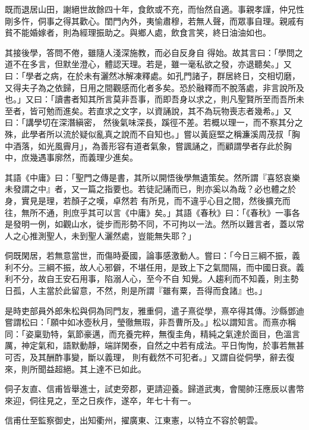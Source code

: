 \begin{pinyinscope}
 既而退居山田，謝絕世故餘四十年，食飲或不充，而怡然自適。事親孝謹，仲兄性剛多忤，侗事之得其歡心。閨門內外，夷愉肅穆，若無人聲，而眾事自理。親戚有貧不能婚嫁者，則為經理振助之。與鄉人處，飲食言笑，終日油油如也。



 其接後學，答問不倦，雖隨人淺深施教，而必自反身自
 得始。故其言曰：「學問之道不在多言，但默坐澄心，體認天理。若是，雖一毫私欲之發，亦退聽矣。」又曰：「學者之病，在於未有灑然冰解凍釋處。如孔門諸子，群居終日，交相切磨，又得夫子為之依歸，日用之間觀感而化者多矣。恐於融釋而不脫落處，非言說所及也。」又曰：「讀書者知其所言莫非吾事，而即吾身以求之，則凡聖賢所至而吾所未至者，皆可勉而進矣。若直求之文字，以資誦說，其不為玩物喪志者幾希。」又曰：「講學切在深潛縝密，
 然後氣味深長，蹊徑不差。若概以理一，而不察其分之殊，此學者所以流於疑似亂真之說而不自知也。」嘗以黃庭堅之稱濂溪周茂叔「胸中酒落，如光風霽月」，為善形容有道者氣象，嘗諷誦之，而顧謂學者存此於胸中，庶幾遇事廓然，而義理少進矣。



 其語《中庸》曰：「聖門之傳是書，其所以開悟後學無遺策矣。然所謂『喜怒哀樂未發謂之中』者，又一篇之指要也。若徒記誦而已，則亦奚以為哉？必也體之於身，實見是理，若顏子之嘆，卓然若
 有所見，而不違乎心目之間，然後擴充而往，無所不通，則庶乎其可以言《中庸》矣。」其語《春秋》曰：「《春秋》一事各是發明一例，如觀山水，徙步而形勢不同，不可拘以一法。然所以難言者，蓋以常人之心推測聖人，未到聖人灑然處，豈能無失耶？」



 侗既閑居，若無意當世，而傷時憂國，論事感激動人。嘗曰：「今日三綱不振，義利不分。三綱不振，故人心邪僻，不堪任用，是致上下之氣間隔，而中國日衰。義利不分，故自王安石用事，陷溺人心，至今不自
 知覺。人趨利而不知義，則主勢日孤，人主當於此留意，不然，則是所謂『雖有粟，吾得而食諸』也。」



 是時吏部員外郎朱松與侗為同門友，雅重侗，遣子熹從學，熹卒得其傳。沙縣鄧迪嘗謂松曰：「願中如冰壺秋月，瑩徹無瑕，非吾曹所及。」松以謂知言。而熹亦稱同：「姿稟勁特，氣節豪邁，而充養完粹，無復圭角，精純之氣達於面目，色溫言厲，神定氣和，語默動靜，端詳閑泰，自然之中若有成法。平日恂恂，於事若無甚可否，及其酬酢事變，斷以義理，
 則有截然不可犯者。」又謂自從侗學，辭去復來，則所聞益超絕。其上達不已如此。



 侗子友直、信甫皆舉進士，試吏旁郡，更請迎養。歸道武夷，會閩帥汪應辰以書幣來迎，侗往見之，至之日疾作，遂卒，年七十有一。



 信甫仕至監察御史，出知衢州，擢廣東、江東憲，以特立不容於朝雲。



\end{pinyinscope}